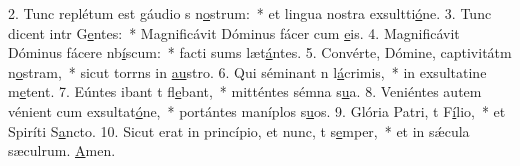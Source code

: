 2. Tunc replétum est gáudio s n\uline{o}strum:~* et lingua nostra exsultti\uline{ó}ne.
3. Tunc dicent intr G\uline{e}ntes:~* Magnificávit Dóminus fácer cum \uline{e}is.
4. Magnificávit Dóminus fácere nb\uline{í}scum:~* facti sums læt\uline{á}ntes.
5. Convérte, Dómine, captivitátm n\uline{o}stram,~* sicut torrns in \uline{au}stro.
6. Qui séminant n l\uline{á}crimis,~* in exsultatine m\uline{e}tent.
7. Eúntes ibant t fl\uline{e}bant,~* mitténtes sémna s\uline{u}a.
8. Veniéntes autem vénient cum exsultat\uline{ó}ne,~* portántes maníplos s\uline{u}os.
9. Glória Patri, t F\uline{í}lio,~* et Spiríti S\uline{a}ncto.
10. Sicut erat in princípio, et nunc, t s\uline{e}mper,~* et in sǽcula sæculrum. \uline{A}men.
